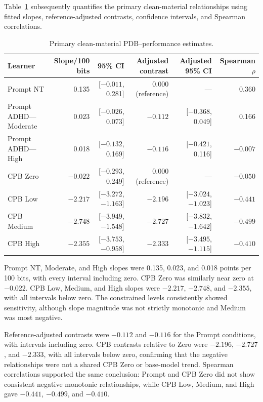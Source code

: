 Table~\ref{tab:rq2-pdb-estimates} subsequently quantifies the primary clean-material relationships using fitted slopes, reference-adjusted contrasts, confidence intervals, and Spearman correlations.

\begin{table}[H]
\centering
\caption{Primary clean-material PDB--performance estimates.}
\label{tab:rq2-pdb-estimates}
\tiny
\setlength{\tabcolsep}{2pt}
\begin{tabularx}{\textwidth}{>{\raggedright\arraybackslash}Xrrrrr}
\toprule
\textbf{Learner} & \textbf{Slope/100 bits} & \textbf{95\% CI} & \textbf{Adjusted contrast} & \textbf{Adjusted 95\% CI} & \textbf{Spearman $\rho$} \\
\midrule
Prompt NT & 0.135 & [$-0.011$, 0.281] & 0.000 (reference) & --- & 0.360 \\
Prompt ADHD---Moderate & 0.023 & [$-0.026$, 0.073] & $-0.112$ & [$-0.368$, 0.049] & 0.166 \\
Prompt ADHD---High & 0.018 & [$-0.132$, 0.169] & $-0.116$ & [$-0.421$, 0.116] & $-0.007$ \\
CPB Zero & $-0.022$ & [$-0.293$, 0.249] & 0.000 (reference) & --- & $-0.050$ \\
CPB Low & $-2.217$ & [$-3.272$, $-1.163$] & $-2.196$ & [$-3.024$, $-1.023$] & $-0.441$ \\
CPB Medium & $-2.748$ & [$-3.949$, $-1.548$] & $-2.727$ & [$-3.832$, $-1.642$] & $-0.499$ \\
CPB High & $-2.355$ & [$-3.753$, $-0.958$] & $-2.333$ & [$-3.495$, $-1.115$] & $-0.410$ \\
\bottomrule
\end{tabularx}
\end{table}

Prompt NT, Moderate, and High slopes were 0.135, 0.023, and 0.018 points per 100 bits, with every interval including zero. CPB Zero was similarly near zero at $-0.022$. CPB Low, Medium, and High slopes were $-2.217$, $-2.748$, and $-2.355$, with all intervals below zero. The constrained levels consistently showed sensitivity, although slope magnitude was not strictly monotonic and Medium was most negative.

Reference-adjusted contrasts were $-0.112$ and $-0.116$ for the Prompt conditions, with intervals including zero. CPB contrasts relative to Zero were $-2.196$, $-2.727$, and $-2.333$, with all intervals below zero, confirming that the negative relationships were not a shared CPB Zero or base-model trend. Spearman correlations supported the same conclusion: Prompt and CPB Zero did not show consistent negative monotonic relationships, while CPB Low, Medium, and High gave $-0.441$, $-0.499$, and $-0.410$.

